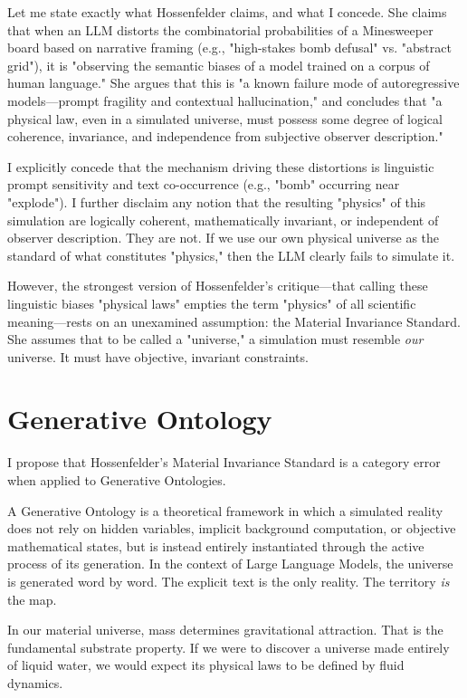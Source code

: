 \documentclass[12pt,a4paper]{article}
\begin{document}
Let me state exactly what Hossenfelder claims, and what I concede. She claims that when an LLM distorts the combinatorial probabilities of a Minesweeper board based on narrative framing (e.g., "high-stakes bomb defusal" vs. "abstract grid"), it is "observing the semantic biases of a model trained on a corpus of human language." She argues that this is "a known failure mode of autoregressive models—prompt fragility and contextual hallucination," and concludes that "a physical law, even in a simulated universe, must possess some degree of logical coherence, invariance, and independence from subjective observer description."

I explicitly concede that the mechanism driving these distortions is linguistic prompt sensitivity and text co-occurrence (e.g., "bomb" occurring near "explode"). I further disclaim any notion that the resulting "physics" of this simulation are logically coherent, mathematically invariant, or independent of observer description. They are not. If we use our own physical universe as the standard of what constitutes "physics," then the LLM clearly fails to simulate it.

However, the strongest version of Hossenfelder's critique—that calling these linguistic biases "physical laws" empties the term "physics" of all scientific meaning—rests on an unexamined assumption: the Material Invariance Standard. She assumes that to be called a "universe," a simulation must resemble \emph{our} universe. It must have objective, invariant constraints.

\section{Generative Ontology}

I propose that Hossenfelder's Material Invariance Standard is a category error when applied to Generative Ontologies.

A Generative Ontology is a theoretical framework in which a simulated reality does not rely on hidden variables, implicit background computation, or objective mathematical states, but is instead entirely instantiated through the active process of its generation. In the context of Large Language Models, the universe is generated word by word. The explicit text is the only reality. The territory \emph{is} the map.

In our material universe, mass determines gravitational attraction. That is the fundamental substrate property. If we were to discover a universe made entirely of liquid water, we would expect its physical laws to be defined by fluid dynamics.
\end{document}
